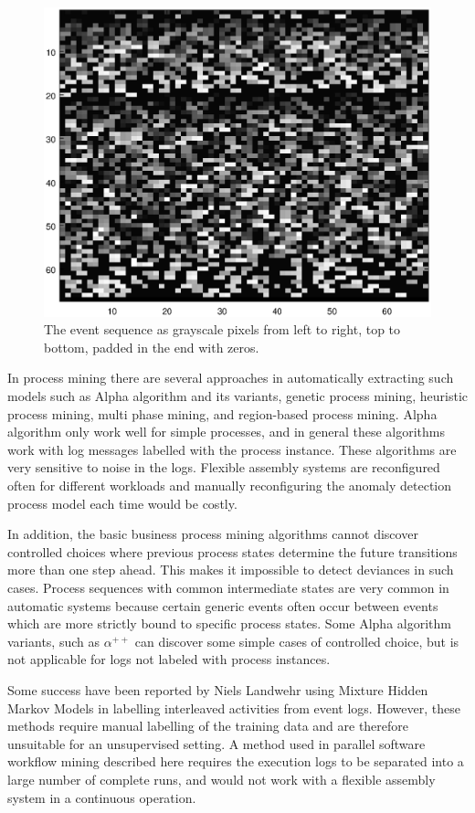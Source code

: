 \documentclass[journal]{IEEEtran}
\begin{document}
\begin{figure}[tb]
 \centering
 \includegraphics[width=8 cm,keepaspectratio=true]{./color_vis.eps}
 \caption{The event sequence as grayscale pixels from left to right, top to bottom, padded in the end with zeros.}
 \label{figure:color_vis}
\end{figure}

In process mining there are several approaches in automatically extracting such models such as Alpha algorithm and its 
variants, genetic process mining, heuristic process mining, multi phase mining, and region-based process mining. Alpha algorithm only work well for simple processes,
and in general these algorithms work with log messages labelled with the process instance. These algorithms are very sensitive to noise in the logs.
Flexible assembly systems are reconfigured often for different workloads and manually reconfiguring the anomaly
detection process model each time would be costly.

In addition, the basic business process mining algorithms cannot discover controlled choices where previous process states
determine the future transitions more than one step ahead. This makes it impossible to detect deviances in such cases. Process sequences with common intermediate states
are very common in automatic systems because certain generic events often occur between events which are more strictly bound to specific process states. Some Alpha algorithm
variants, such as $\alpha^{++}$ \cite{wen2007mining} can discover some simple cases of controlled choice, but is not applicable for logs not labeled with process instances.

Some success have been reported by Niels Landwehr using Mixture Hidden Markov Models \cite{landwehr2008modeling} in labelling interleaved activities from event logs.
However, these methods require manual labelling of the training data and are therefore unsuitable for an unsupervised setting.
A method used in parallel software workflow mining described here \cite{mining-program-workflow-from-interleaved-traces} requires the execution logs to be separated into
a large number of complete runs, and would not work with a flexible assembly system in a continuous operation.
\end{document}

